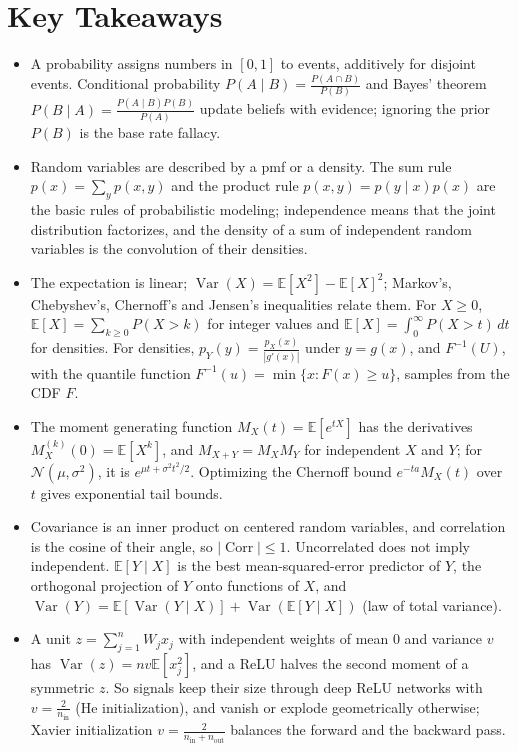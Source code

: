 \documentclass[11pt]{article}
\newcommand{\E}{\mathbb{E}}
\DeclareMathOperator{\Var}{Var}
\DeclareMathOperator{\Corr}{Corr}
\theoremstyle{definition}
\theoremstyle{plain}
\theoremstyle{remark}
\begin{document}
\section{Key Takeaways}
\begin{itemize}[leftmargin=*]
    \item A probability assigns numbers in $[0, 1]$ to events, additively for disjoint events. Conditional probability $P(A \mid B) = \frac{P(A \cap B)}{P(B)}$ and Bayes' theorem $P(B \mid A) = \frac{P(A \mid B)P(B)}{P(A)}$ update beliefs with evidence; ignoring the prior $P(B)$ is the base rate fallacy.
    \item Random variables are described by a pmf or a density. The sum rule $p(x) = \sum_y p(x, y)$ and the product rule $p(x, y) = p(y \mid x)p(x)$ are the basic rules of probabilistic modeling; independence means that the joint distribution factorizes, and the density of a sum of independent random variables is the convolution of their densities.
    \item The expectation is linear; $\Var(X) = \E[X^2] - \E[X]^2$; Markov's, Chebyshev's, Chernoff's and Jensen's inequalities relate them. For $X \geq 0$, $\E[X] = \sum_{k \geq 0} P(X > k)$ for integer values and $\E[X] = \int_0^\infty P(X > t)\, dt$ for densities. For densities, $p_Y(y) = \frac{p_X(x)}{|g'(x)|}$ under $y = g(x)$, and $F^{-1}(U)$, with the quantile function $F^{-1}(u) = \min\{x : F(x) \geq u\}$, samples from the CDF $F$.
    \item The moment generating function $M_X(t) = \E[e^{tX}]$ has the derivatives $M_X^{(k)}(0) = \E[X^k]$, and $M_{X+Y} = M_XM_Y$ for independent $X$ and $Y$; for $\mathcal{N}(\mu, \sigma^2)$, it is $e^{\mu t + \sigma^2t^2/2}$. Optimizing the Chernoff bound $e^{-ta}M_X(t)$ over $t$ gives exponential tail bounds.
    \item Covariance is an inner product on centered random variables, and correlation is the cosine of their angle, so $|\Corr| \leq 1$. Uncorrelated does not imply independent. $\E[Y \mid X]$ is the best mean-squared-error predictor of $Y$, the orthogonal projection of $Y$ onto functions of $X$, and $\Var(Y) = \E[\Var(Y \mid X)] + \Var(\E[Y \mid X])$ (law of total variance).
    \item A unit $z = \sum_{j=1}^n W_jx_j$ with independent weights of mean $0$ and variance $v$ has $\Var(z) = nv\E[x_j^2]$, and a ReLU halves the second moment of a symmetric $z$. So signals keep their size through deep ReLU networks with $v = \frac{2}{n_{\text{in}}}$ (He initialization), and vanish or explode geometrically otherwise; Xavier initialization $v = \frac{2}{n_{\text{in}} + n_{\text{out}}}$ balances the forward and the backward pass.

\end{itemize}
\end{document}
